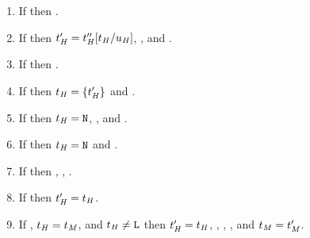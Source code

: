 \begin{lemma}
\begin{enumerate}

\item If \judeh{\env}{\expfix{\varexph}}{\vartyh} then \judeh{\env}{\varexph}{\tyfun{\vartyh}{\vartyh}}.


\item If \judeh{\env}{\exptapp{\varexph}{\first{\vartyh}}}{\second{\vartyh}} then $t_{\mathit{H}}' = t_{\mathit{H}}''[t_{\mathit{H}}/u_{\mathit{H}}]$, \judth{\env}{\vartyh}, and \judeh{\env}{\varexph}{\tyfor{\tyvarh}{\third{\vartyh}}}.


\item If \judeh{\env}{\exphd{\varexph}}{\vartyh} then \judeh{\env}{\varexph}{\tylist{\vartyh}}.


\item If \judeh{\env}{\exptl{\varexph}}{\first{\vartyh}} then $t_{\mathit{H}} = \lbrace t_{\mathit{H}}' \rbrace$ and \judeh{\env}{\varexph}{\tylist{\second{\vartyh}}}.


\item If \judeh{\env}{\expop{\first{\varexph}}{\second{\varexph}}}{\first{\vartyh}} then $t_{\mathit{H}} = \mathtt{N}$, \judeh{\env}{\first{\varexph}}{\tynum}, and \judeh{\env}{\second{\varexph}}{\tynum}.


\item If \judeh{\env}{\exppnull{\varexph}}{\first{\vartyh}} then $t_{\mathit{H}} = \mathtt{N}$ and \judeh{\env}{\varexph}{\tylist{\second{\vartyh}}}.


\item If \judeh{\env}{\expif{\first{\varexph}}{\second{\varexph}}{\third{\varexph}}}{\vartyh} then \judeh{\env}{\first{\varexph}}{\tynum}, \judeh{\env}{\second{\varexph}}{\vartyh}, \judeh{\env}{\third{\varexph}}{\vartyh}.


\item If  then $t_{\mathit{H}}' = t_{\mathit{H}}$.


\item If \judeh{\env}{\exphm{\first{\vartyh}}{\first{\vartym}}{\varexpm}}{\second{\vartyh}}, $t_{\mathit{H}} = t_{\mathit{M}}$, and $t_{\mathit{H}} \neq \mathtt{L}$ then $t_{\mathit{H}}' = t_{\mathit{H}}$, \judth{\env}{\first{\vartyh}}, \judtm{\env}{\first{\vartym}}, \judem{\env}{\varexpm}{\second{\vartym}}, and $t_{\mathit{M}} = t_{\mathit{M}}'$.


\end{enumerate}
\end{lemma}
